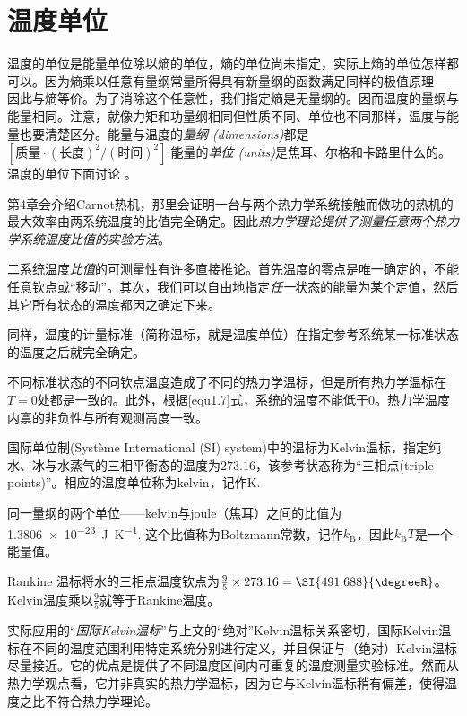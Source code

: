 \section{温度单位}
\label{sec2.6}
温度的单位是能量单位除以熵的单位，熵的单位尚未指定，实际上熵的单位怎样都可以。因为熵乘以任意有量纲常量所得具有新量纲的函数满足同样的极值原理——因此与熵等价。为了消除这个任意性，我们指定熵是无量纲的。因而温度的量纲与能量相同。注意，就像力矩和功量纲相同但性质不同、单位也不同那样，温度与能量也要清楚区分。能量与温度的{\it 量纲 (dimensions)}都是$[\text{质量} \cdot (\text{长度})^2 / (\text{时间})^2].$能量的{\it 单位 (units)}是焦耳、尔格和卡路里什么的。温度的单位下面讨论%
%
。

第4章会介绍Carnot热机，那里会证明一台与两个热力学系统接触而做功的热机的最大效率由两系统温度的比值完全确定。因此{\it 热力学理论提供了测量任意两个热力学系统温度比值的实验方法}。

二系统温度{\it 比值}的可测量性有许多直接推论。首先温度的零点是唯一确定的，不能任意钦点或“移动”。其次，我们可以自由地指定{\it 任一}状态的能量为某个定值，然后其它所有状态的温度都因之确定下来。

同样，温度的计量标准（简称温标，就是温度单位）在指定参考系统某一标准状态的温度之后就完全确定。

不同标准状态的不同钦点温度造成了不同的热力学温标，但是所有热力学温标在$T = 0$处都是一致的。此外，根据\eqref{equ1.7}式，系统的温度不能低于$0$。热力学温度内禀的非负性与所有观测高度一致。

国际单位制(Système International (SI) system)中的温标为Kelvin温标，指定纯水、冰与水蒸气的三相平衡态的温度为$273.16$，该参考状态称为“三相点(triple points)”。相应的温度单位称为kelvin，记作$\si{\kelvin}$.

同一量纲的两个单位——kelvin与joule（焦耳）之间的比值为\SI{1.3806e-23}{\joule\per\kelvin}. 这个比值称为Boltzmann常数，记作$k_\text{B}$，因此$k_\text{B} T$是一个能量值。

Rankine 温标将水的三相点温度钦点为$\frac{9}{5} \times 273.16 = \SI{491.688}{\degreeR}$。Kelvin温度乘以$\frac{9}{5}$就等于Rankine温度。

实际应用的“{\it 国际Kelvin温标}”与上文的“绝对”Kelvin温标关系密切，国际Kelvin温标在不同的温度范围利用特定系统分别进行定义，并且保证与（绝对）Kelvin温标尽量接近。它的优点是提供了不同温度区间内可重复的温度测量实验标准。然而从热力学观点看，它并非真实的热力学温标，因为它与Kelvin温标稍有偏差，使得温度之比不符合热力学理论。

